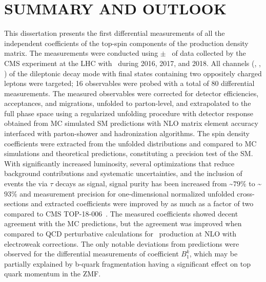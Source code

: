 
\chapter{SUMMARY AND OUTLOOK}
\label{Conclusion}
This dissertation presents the first differential measurements of all the independent coefficients of the top-spin components of the \ttbar production density matrix.
The measurements were conducted using \lumivalueRuniiUL $\pm$ \lumierrRuniiUL\ of data collected by the CMS experiment at the LHC with \beamenergy\ during 2016, 2017, and 2018.
All channels (\ee, \emu, \mumu) of the \ttbar dileptonic decay mode with final states containing two oppositely charged leptons were targeted; 16 observables were probed with a total of 80 differential measurements.
The measured observables were corrected for detector efficiencies, acceptances, and migrations, unfolded to parton-level, and extrapolated to the full phase space using a regularized unfolding procedure with detector response obtained from MC simulated SM predictions with NLO matrix element accuracy interfaced with parton-shower and hadronization algorithms.
The spin density coefficients were extracted from the unfolded distributions and compared to MC simulations and theoretical predictions, constituting a precision test of the SM. 
With significantly increased luminosity, several optimizations that reduce background contributions and systematic uncertainties, and the inclusion of \ttbar events the via $\tau$ decays as signal, signal purity has been increased from \sim$79\%$ to \sim$93\%$ and measurement precision for one-dimensional normalized unfolded cross-sections and extracted coefficients were improved by as much as a factor of two compared to CMS TOP-18-006~\cite{Sirunyan:2681777}.
The measured coefficients showed decent agreement with the MC predictions, but the agreement was improved when compared to QCD perturbative calculations for \ttbar\ production at NLO with electroweak corrections.
The only notable deviations from predictions were observed for the differential measurements of coefficient $B_{1}^{k}$, which may be partially explained by b-quark fragmentation having a significant effect on top quark momentum in the \ttbar ZMF.

